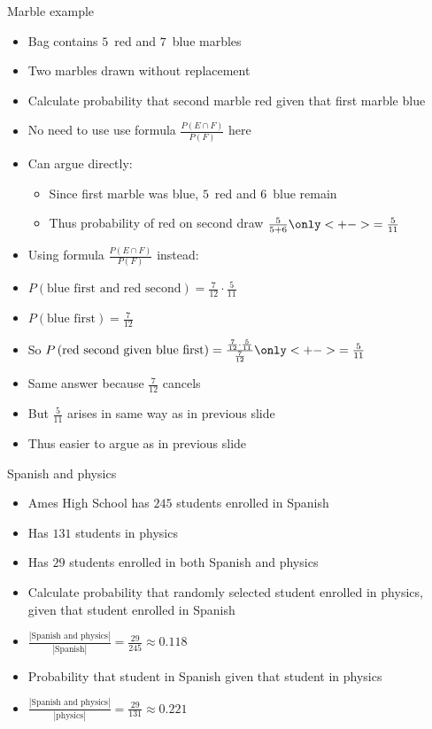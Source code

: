 \documentclass[handout]{beamer}
\theoremstyle{definition}
\begin{document}
\begin{frame}{Marble example}
\begin{itemize}
\item Bag contains $5$~red and $7$~blue marbles
\item Two marbles drawn without replacement
\item Calculate probability that second marble red
given that first marble blue
\item No need to use use formula
$\frac{P\left(E\cap F\right)}{P\left(F\right)}$ here
\item Can argue directly:
\begin{itemize}
\item Since first marble was blue, $5$~red and \alert{$6$~blue} remain
\item Thus probability of red on second draw $\frac{5}{5+6}
\only<+->{=\frac{5}{11}}$
\end{itemize}
\end{itemize}
\end{frame}

\begin{frame}
\begin{itemize}
\item Using formula
$\frac{P\left(E\cap F\right)}{P\left(F\right)}$ instead:
\item $P\left(\text{blue first and red second}\right)
=\frac{7}{12}\cdot\frac{5}{11}$
\item $P\left(\text{blue first}\right)=\frac{7}{12}$
\item So $P\left(\text{red second given blue first}\right)
=\frac{\frac{7}{12}\cdot\frac{5}{11}}{\frac{7}{12}}
\only<+->{=\frac{5}{11}}$
\item Same answer because $\frac{7}{12}$ cancels
\item But $\frac{5}{11}$ arises in same way as in previous slide
\item Thus easier to argue as in previous slide
\end{itemize}
\end{frame}


\begin{frame}{Spanish and physics}
\begin{itemize}
\item Ames High School has $245$ students enrolled in Spanish
\item Has $131$ students in physics
\item Has $29$ students enrolled in both Spanish and physics
\item Calculate probability that randomly selected student
enrolled in physics, given that student enrolled in Spanish
\item $\frac{\left|\text{Spanish and physics}\right|}
{\left|\text{Spanish}\right|}
=\frac{29}{245}\approx 0.118$
\item Probability that student in Spanish given that student in physics
\item $\frac{\left|\text{Spanish and physics}\right|}
{\left|\text{physics}\right|}
=\frac{29}{131}\approx 0.221$
\end{itemize}
\end{frame}
\end{document}
